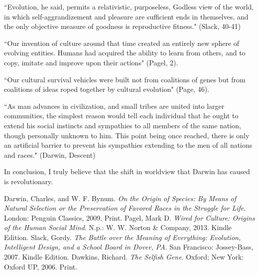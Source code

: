 \documentclass[11pt, oneside]{article}
\begin{document}
``Evolution, he said, permits a relativistic, purposeless, Godless view of the world, in which self-aggrandizement and pleasure are sufficient ends in themselves, and the only objective measure of goodness is reproductive fitness." (Slack, 40-41)

``Our invention of culture around that time created an entirely new sphere of evolving entities. Humans had acquired the ability to learn from others, and to copy, imitate and improve upon their actions" (Pagel, 2).

``Our cultural survival vehicles were built not from coalitions of genes but from coalitions of ideas roped together by cultural evolution" (Page, 46).

``As man advances in civilization, and small tribes are united into larger communities, the simplest reason would tell each individual that he ought to extend his social instincts and sympathies to all members of the same nation, though personally unknown to him. This point being once reached, there is only an artificial barrier to prevent his sympathies extending to the men of all nations and races." (Darwin, Descent)


\par In conclusion, I truly believe that the shift in worldview that Darwin has caused is revolutionary.


\begin{thebibliography}{9}
	Darwin, Charles, and W. F. Bynum.
	\emph{On the Origin of Species: By Means of Natural Selection or the Preservation of Favored Races in the Struggle for Life}.
	London: Penguin Classics, 2009.
	Print.
	Pagel, Mark D. 
	\emph{Wired for Culture: Origins of the Human Social Mind}. 
	N.p.: W. W. Norton \& Company, 2013. 
	Kindle Edition. 
	Slack, Gordy. 
	\emph{The Battle over the Meaning of Everything: Evolution, Intelligent Design, and a School Board in Dover, PA}.
	San Francisco: Jossey-Bass, 2007. 
	Kindle Edition.
	Dawkins, Richard. 
	\emph{The Selfish Gene}.
	Oxford; New York: Oxford UP, 2006. 
	Print.
\end{thebibliography}
\end{document}
